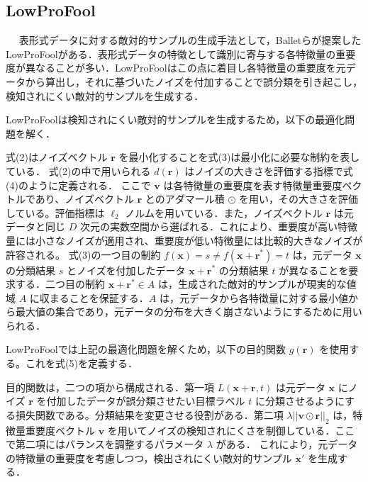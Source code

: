 \subsection{LowProFool}　%
表形式データに対する敵対的サンプルの生成手法として，Balletらが提案したLowProFool\cite{ballet2019imperceptible}がある．表形式データの特徴として識別に寄与する各特徴量の重要度が異なることが多い．LowProFoolはこの点に着目し各特徴量の重要度を元データから算出し，それに基づいたノイズを付加することで誤分類を引き起こし，検知されにくい敵対的サンプルを生成する．

LowProFoolは検知されにくい敵対的サンプルを生成するため，以下の最適化問題を解く．

式(2)はノイズベクトル $\bm{r}$ を最小化することを式(3)は最小化に必要な制約を表している．
式(2)の中で用いられる $d(\bm{r})$ はノイズの大きさを評価する指標で式(4)のように定義される．
ここで $\bm{v}$ は各特徴量の重要度を表す特徴量重要度ベクトルであり、ノイズベクトル $\bm{r}$ とのアダマール積 $\odot$ を用い，その大きさを評価している。評価指標は $\ell_2$ ノルムを用いている．また，ノイズベクトル $\bm{r}$ は元データと同じ $D$ 次元の実数空間から選ばれる．これにより、重要度が高い特徴量には小さなノイズが適用され、重要度が低い特徴量には比較的大きなノイズが許容される。
式(3)の一つ目の制約 $f(\bm{x}) = s \neq f(\bm{x}+\bm{r}^*) = t$ は，元データ $\bm{x}$ の分類結果 $s$ とノイズを付加したデータ $\bm{x}+\bm{r}^*$ の分類結果 $t$ が異なることを要求する．二つ目の制約 $\bm{x}+\bm{r}^* \in A$ は，生成された敵対的サンプルが現実的な値域 $A$ に収まることを保証する．$A$ は，元データから各特徴量に対する最小値から最大値の集合であり，元データの分布を大きく崩さないようにするために用いられる．

LowProFoolでは上記の最適化問題を解くため，以下の目的関数 $g(\bm{r})$ を使用する。これを式(5)を定義する．


 目的関数は，二つの項から構成される．第一項 $L(\bm{x}+\bm{r}, t)$ は元データ $\bm{x}$ にノイズ $\bm{r}$ を付加したデータが誤分類させたい目標ラベル $t$ に分類させるようにする損失関数である。分類結果を変更させる役割がある．第二項 $\lambda ||\bm{v} \odot \bm{r}||_2$ は，特徴量重要度ベクトル $\bm{v}$ を用いてノイズの検知されにくさを制御している．ここで第二項にはバランスを調整するパラメータ $\lambda$ がある．
 これにより，元データの特徴量の重要度を考慮しつつ，検出されにくい敵対的サンプル $\bm{x}'$ を生成する．

